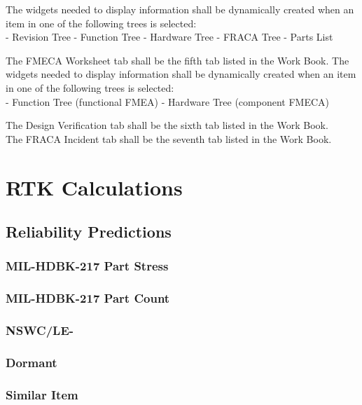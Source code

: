 \documentclass[11pt, 12pt, twoside, onecolumn]{article}
\begin{document}
The widgets needed to display information shall be dynamically created when an item in one of the following trees is selected: \\

    - Revision Tree
    - Function Tree
    - Hardware Tree
    - FRACA Tree
    - Parts List

\noindent The FMECA Worksheet tab shall be the fifth tab listed in the Work Book.  The widgets needed to display information shall be dynamically created when an item in one of the following trees is selected: \\

    - Function Tree (functional FMEA)
    - Hardware Tree (component FMECA)

\noindent The Design Verification tab shall be the sixth tab listed in the Work Book. \\

\noindent The FRACA Incident tab shall be the seventh tab listed in the Work Book. \\

\section{\bf \Large RTK Calculations}

\subsection{\bf \large Reliability Predictions}

\subsubsection{\bf MIL-HDBK-217 Part Stress}
\subsubsection{\bf MIL-HDBK-217 Part Count}
\subsubsection{\bf NSWC/LE-}
\subsubsection{\bf Dormant}
\subsubsection{\bf Similar Item}
\end{document}
